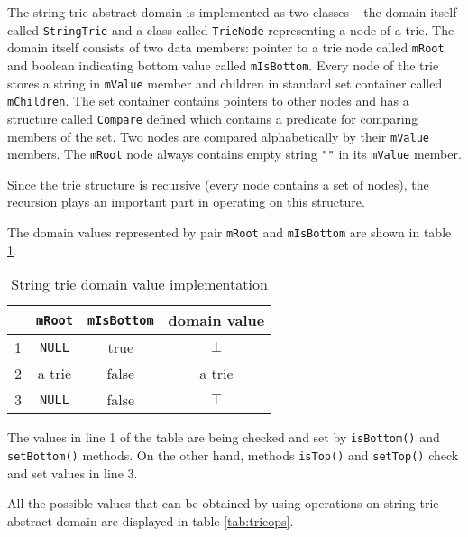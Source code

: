 \documentclass[12pt,final,oneside]{fithesis2}
\theoremstyle{definition}
\begin{document}
The string trie abstract domain is implemented as two classes -- the domain
itself called \texttt{StringTrie} and a class called \texttt{TrieNode}
representing a node of a trie.
The domain itself consists of two data members: pointer to a trie node called
\texttt{mRoot} and boolean indicating bottom value called \texttt{mIsBottom}.
Every node of the trie stores a string in \texttt{mValue} member and children
in standard set container called \texttt{mChildren}. The set container contains
pointers to other nodes and has a structure called \texttt{Compare} defined
which contains a predicate for comparing members of the set. Two nodes are
compared alphabetically by their \texttt{mValue} members. The \texttt{mRoot}
node always contains empty string \texttt{""} in its \texttt{mValue} member.

Since the trie structure is recursive (every node contains a set of nodes), the
recursion plays an important part in operating on this structure.

The domain values represented by pair \texttt{mRoot} and \texttt{mIsBottom}
are shown in table \ref{tab:stringtrie}.

\begin{table}[ht]
\centering
\begin{tabular}{r|c|c|c}
  & \texttt{mRoot} & \texttt{mIsBottom} & domain value \\
\hline
1 & \texttt{NULL}  & true      & $\bot$ \\
2 & a trie         & false     & a trie \\
3 & \texttt{NULL}  & false     & $\top$
\end{tabular}
\caption{String trie domain value implementation}
\label{tab:stringtrie}
\end{table}

The values in line 1 of the table are being checked and set by
\texttt{isBottom()} and \texttt{setBottom()} methods. On the other hand,
methods \texttt{isTop()} and \texttt{setTop()} check and set values in line 3.

All the possible values that can be obtained by using operations on string trie
abstract domain are displayed in table \ref{tab:trieops}.
\end{document}
